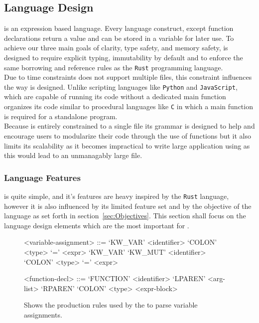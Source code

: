 \subsection{Language Design}
\label{sec:LanguageDesign}

\lang{} is an expression based language. Every language construct, except function
declarations return a value and can be stored in a variable for later use. To achieve
our three main goals of clarity, type safety, and memory safety, \lang{} is designed
to require explicit typing, immutability by default and to enforce the same
borrowing and reference rules as the \texttt{Rust} programming language.\\

Due to time constraints \lang{} does not support multiple files, this constraint
influences the way \lang{} is designed. Unlike scripting languages like
\texttt{Python} and \texttt{JavaScript}, which are capable of running its code without
a dedicated main function \lang{} organizes its code similar to procedural
languages like \texttt{C} in which a main function is required for a standalone
program. \\

Because \lang{} is entirely constrained to a single file its grammar is designed to
help and encourage users to modularize their code through the use of functions but it
also limits its scalability as it becomes impractical to write large application
using \lang{} as this would lead to an unmanagably large file. 

\subsubsection{Language Features}
\label{sec:Grammar}

\lang{} is quite simple, and it's features are heavy inspired by the
\texttt{Rust} language\cite{RUST}, however it is also influenced by its limited feature set and
by the objective of the language as set forth in section~\ref{sec:Objectives}. This
section shall focus on the language design elements which are the most important for
\lang{}.

\begin{figure}[ht]
\centering
\begin{grammar}
<variable-assignment> ::= `KW_VAR' <identifier> `COLON' <type> `=' <expr>
\alt `KW_VAR' `KW_MUT' <identifier> `COLON' <type> `=' <expr>

<function-decl> ::= `FUNCTION' <identifier> `LPAREN' <arg-list> `RPAREN' `COLON' <type> <expr-block>
\end{grammar}
\caption{Shows the production rules used by the \parser{} to parse variable
assignments.}
\label{fig:assingmentRule}
\end{figure}

